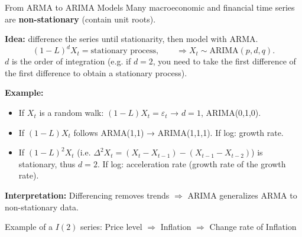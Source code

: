 \documentclass{beamer}
\begin{document}
\begin{frame}{From ARMA to ARIMA Models}
\small
Many macroeconomic and financial time series are \textbf{non-stationary} (contain unit roots).

\pause
\textbf{Idea:} difference the series until stationarity, then model with ARMA.
\[
(1 - L)^d X_t = \text{stationary process}, \qquad
\Rightarrow X_t \sim \text{ARIMA}(p,d,q).
\]
$d$ is the order of integration (e.g. if $d=2$, you need to take the first difference of the first difference to obtain a stationary process). 

\textbf{Example:}
\begin{itemize}
    \item If $X_t$ is a random walk: $(1 - L)X_t = \varepsilon_t$ → $d=1$, ARIMA(0,1,0).
    \item If $(1-L)X_t$ follows ARMA(1,1) → ARIMA(1,1,1). If log: growth rate.
    \item If $(1-L)^2X_t$ (i.e. $\Delta^2 X_t = (X_t - X_{t-1}) - (X_{t-1} - X_{t-2})$) is stationary, thus $d=2$. If log: acceleration rate (growth rate of the growth rate).
\end{itemize}

\textbf{Interpretation:}
Differencing removes trends $\Longrightarrow$ ARIMA generalizes ARMA to non-stationary data.

Example of a $I(2)$ series: Price level $\Rightarrow$ Inflation $\Rightarrow$ Change rate of Inflation
\end{frame}
\end{document}
